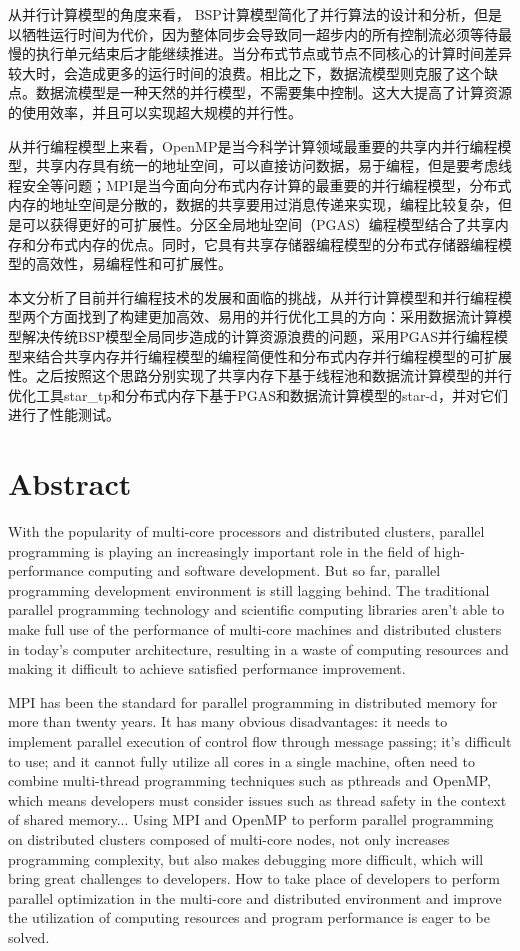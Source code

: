 从并行计算模型的角度来看， BSP计算模型简化了并行算法的设计和分析，但是以牺牲运行时间为代价，因为整体同步会导致同一超步内的所有控制流必须等待最慢的执行单元结束后才能继续推进。当分布式节点或节点不同核心的计算时间差异较大时，会造成更多的运行时间的浪费。相比之下，数据流模型则克服了这个缺点。数据流模型是一种天然的并行模型，不需要集中控制。这大大提高了计算资源的使用效率，并且可以实现超大规模的并行性。

从并行编程模型上来看，OpenMP是当今科学计算领域最重要的共享内并行编程模型，共享内存具有统一的地址空间，可以直接访问数据，易于编程，但是要考虑线程安全等问题；MPI是当今面向分布式内存计算的最重要的并行编程模型，分布式内存的地址空间是分散的，数据的共享要用过消息传递来实现，编程比较复杂，但是可以获得更好的可扩展性。分区全局地址空间（PGAS）编程模型结合了共享内存和分布式内存的优点。同时，它具有共享存储器编程模型的分布式存储器编程模型的高效性，易编程性和可扩展性。

本文分析了目前并行编程技术的发展和面临的挑战，从并行计算模型和并行编程模型两个方面找到了构建更加高效、易用的并行优化工具的方向：采用数据流计算模型解决传统BSP模型全局同步造成的计算资源浪费的问题，采用PGAS并行编程模型来结合共享内存并行编程模型的编程简便性和分布式内存并行编程模型的可扩展性。之后按照这个思路分别实现了共享内存下基于线程池和数据流计算模型的并行优化工具star\_tp和分布式内存下基于PGAS和数据流计算模型的star-d，并对它们进行了性能测试。

\chapter*{Abstract}

With the popularity of multi-core processors and distributed clusters, parallel programming is playing an increasingly important role in the field of high-performance computing and software development. But so far, parallel programming development environment is still lagging behind. The traditional parallel programming technology and scientific computing libraries aren't able to make full use of the performance of multi-core machines and distributed clusters in today's computer architecture, resulting in a waste of computing resources and making it difficult to achieve satisfied performance improvement.

MPI has been the standard for parallel programming in distributed memory for more than twenty years. It has many obvious disadvantages: it needs to implement parallel execution of control flow through message passing; it's difficult to use; and it cannot fully utilize all cores in a single machine, often need to combine multi-thread programming techniques such as pthreads and OpenMP, which means developers must consider issues such as thread safety in the context of shared memory... Using MPI and OpenMP to perform parallel programming on distributed clusters composed of multi-core nodes, not only increases programming complexity, but also makes debugging more difficult, which will bring great challenges to developers. How to take place of developers to perform parallel optimization in the multi-core and distributed environment and improve the utilization of computing resources and program performance is eager to be solved.


